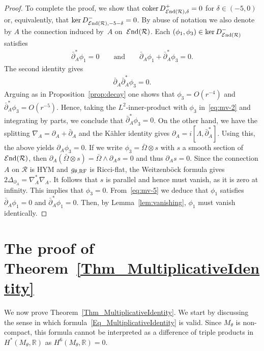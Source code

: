 \documentclass[10pt,a4paper]{amsart}
\numberwithin{equation}{section}
\newcommand{\cE}{\mathcal{E}}
\newcommand{\cR}{\mathcal{R}}
\newcommand{\R}{{\mathbb R}}
\newcommand{\cEnd}{\cE{\rm nd}}
\newcommand{\coker}{\operatorname{coker}}
\newcommand{\delbar}{\bar \del}
\newcommand{\del}{\partial}
\newcommand{\RF}{{\rm RF}}
\begin{document}
\begin{proof}
 To complete the proof, we show that $\coker
 D^+_{\cEnd(\cR),\delta}=0$ for $\delta\in(-5,0)$ or, equivalently,
 that $\ker D^{-}_{\cEnd(\cR),-5-\delta}=0$.  By abuse of notation we
 also denote by $A$ the connection induced by~$A$ on~$\cEnd(\cR)$.
 Each $(\phi_1, \phi_3) \in \ker D^{-}_{\cEnd(\cR)}$ satisf\/ies
 \begin{gather}\label{eq:mv-5}
   \delbar_A^* \phi_1 =0 \qquad\text{and}\qquad \delbar_A \phi_1 +
   \delbar_A^*\phi_3 =0.
 \end{gather}
 The second identity gives
 \begin{gather}\label{eq:mv-2}
   \delbar_A \delbar_A^* \phi_3 =0.
 \end{gather}
 Arguing as in Proposition~\ref{prop:decay} one shows that $\phi_3 =
 O(r^{-4})$ and $\delbar^*_A \phi_3 = O(r^{-5})$.  Hence, taking
 the $L^2$-inner-product with $\phi_3$ in~\eqref{eq:mv-2} and
 integrating by parts, we conclude that $\delbar_A^* \phi_3 =0$.  On
 the other hand, we have the splitting $\nabla_A = \partial_A +
 \delbar_A$ and the K\"ahler identity gives $\partial_A = i [\Lambda,
 \delbar^*_A]$. Using this, the above yields $\partial_A \phi_3 =0$.
 If we write $\phi_3 = \bar\Omega\otimes s$ with $s$ a smooth section
 of $\cEnd(\cR)$, then $\del_{A} (\bar\Omega \otimes s) = \bar\Omega
 \wedge \del_{A}s =0$ and thus $\del_{A}s=0$.  Since the connection
 $A$ on $\cR$ is HYM and $g_{\theta,\RF}$ is Ricci-f\/lat, the
 Weitzenb\"ock formula gives $2\Delta_{\del_A}=\nabla_A^*\nabla_A$.  It
 follows that $s$ is parallel and hence must vanish, as it is zero at
 inf\/inity.  This implies that $\phi_3 =0$. From~\eqref{eq:mv-5} we
 deduce that $\phi_1$ satisf\/ies $\delbar_A\phi_1 = 0$ and $\delbar_A^*
 \phi_1 =0$.  Then, by Lemma~\ref{lem:vanishing}, $\phi_1$ must vanish
 identically.
\end{proof}



\section{The proof of Theorem~\ref{Thm_MultiplicativeIdentity}}

\label{sec:mckay}
\label{Sec_AnalyticProof}

We now prove Theorem~\ref{Thm_MultiplicativeIdentity}.  We start by discussing the
sense in which formula~\eqref{Eq_MultiplicativeIdentity} is valid. Since
$M_{\theta}$ is non-compact, this formula cannot be interpreted as a
dif\/ference of triple products in $H^*(M_{\theta},\R)$ as
$H^6(M_{\theta},\R) =0$.
\end{document}
